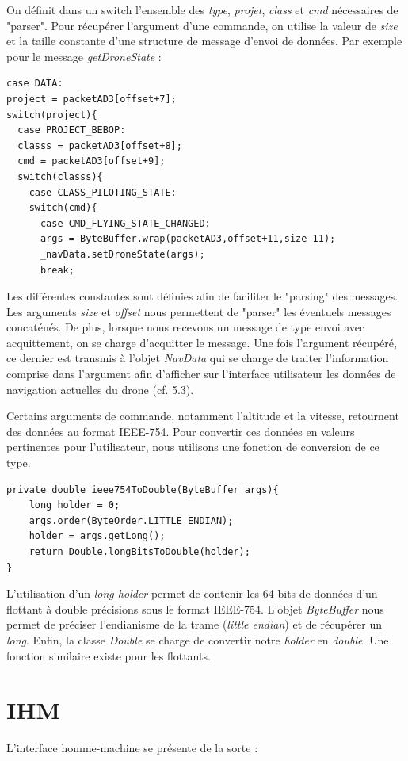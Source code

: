 \documentclass[12pt, openany]{report}
\begin{document}
On définit dans un switch l'ensemble des \textit{type}, \textit{projet}, \textit{class} et \textit{cmd} nécessaires de "parser". Pour récupérer l'argument d'une commande, on utilise la valeur de \textit{size} et la taille constante d'une structure de message d'envoi de données. Par exemple pour le message \textit{getDroneState} : 
\begin{lstlisting}[frame=single]
case DATA:
project = packetAD3[offset+7]; 
switch(project){
  case PROJECT_BEBOP:
  classs = packetAD3[offset+8];
  cmd = packetAD3[offset+9];
  switch(classs){
    case CLASS_PILOTING_STATE:
	switch(cmd){
	  case CMD_FLYING_STATE_CHANGED:
	  args = ByteBuffer.wrap(packetAD3,offset+11,size-11);
	  _navData.setDroneState(args);
	  break;
\end{lstlisting}
Les différentes constantes sont définies afin de faciliter le "parsing" des messages. Les arguments \textit{size} et \textit{offset} nous permettent de "parser" les éventuels messages concaténés. De plus, lorsque nous recevons un message de type envoi avec acquittement, on se charge d'acquitter le message. Une fois l'argument récupéré, ce dernier est transmis à l'objet \textit{NavData} qui se charge de traiter l'information comprise dans l'argument afin d'afficher sur l'interface utilisateur les données de navigation actuelles du drone (cf. 5.3).

Certains arguments de commande, notamment l'altitude et la vitesse, retournent des données au format IEEE-754. Pour convertir ces données en valeurs pertinentes pour l'utilisateur, nous utilisons une fonction de conversion de ce type.

\begin{lstlisting}[frame=single]
private double ieee754ToDouble(ByteBuffer args){
	long holder = 0;
	args.order(ByteOrder.LITTLE_ENDIAN);
	holder = args.getLong();
	return Double.longBitsToDouble(holder);
}
\end{lstlisting}
L'utilisation d'un \textit{long holder} permet de contenir les 64 bits de données d'un flottant à double précisions sous le format IEEE-754. L'objet \textit{ByteBuffer} nous permet de préciser l'endianisme de la trame (\textit{little endian}) et de récupérer un \textit{long}. Enfin, la classe \textit{Double} se charge de convertir notre \textit{holder} en \textit{double}. Une fonction similaire existe pour les flottants.



\section{IHM}
L'interface homme-machine se présente de la sorte :
\end{document}
